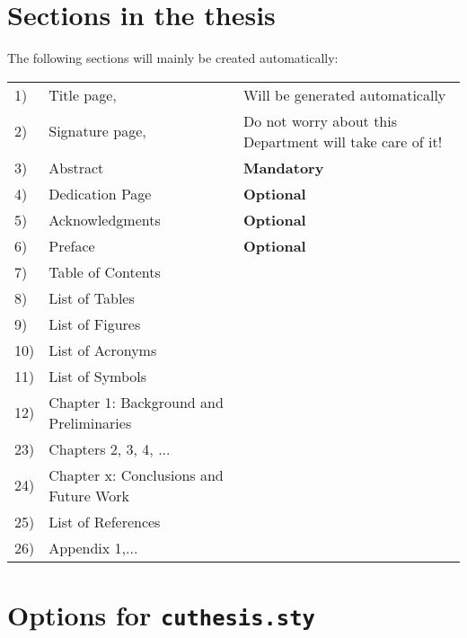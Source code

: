 \documentclass{article}
\begin{document}
\section{Sections in the thesis}
The following sections will mainly be created automatically:\par
\begin{tabular}{llp{4cm}}
1)&  Title page,&         Will be generated automatically\\
2)&  Signature page,&     Do not worry about this Department will take care of it!\\
3)&  Abstract&            \textbf{Mandatory}\\
4)&  Dedication Page&     \textbf{Optional}\\
5)&  Acknowledgments&     \textbf{Optional}\\
6)&  Preface&             \textbf{Optional}\\
7)&  Table of Contents& \\
8)&  List of Tables& \\
9)&  List of Figures& \\
10)& List of Acronyms& \\
11)& List of Symbols& \\
12)& Chapter 1: Background and Preliminaries& \\
23)& Chapters 2, 3, 4, ... & \\
24)& Chapter x: Conclusions and Future Work& \\
25)& List of References& \\
26)& Appendix 1,...& \\
\end{tabular}


\section{Options for \texttt{cuthesis.sty}}
\end{document}

